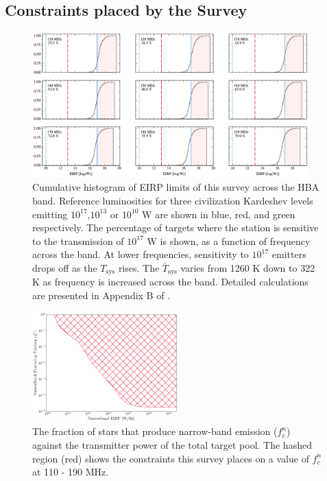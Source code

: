 \subsection{Constraints placed by the Survey}
\begin{figure}
    \centering
    \includegraphics[width = 0.95\textwidth]{figs/EIRP_hist_plot.pdf}
    \caption{Cumulative histogram of EIRP limits of this survey across the HBA band. Reference luminosities for three civilization Kardeshev levels emitting $10^{17}$,$10^{13}$ or $10^{10}$ W are shown in blue, red, and green respectively. The percentage of targets where the station is sensitive to the transmission of $10^{17}$ W is shown, as a function of frequency across the band. At lower frequencies, sensitivity to $10^{17}$ emitters drops off as the $T_{\text{sys}}$ rises. The $\bar T_{\text{sys}}$ varies from 1260 K down to 322 K as frequency is increased across the band. Detailed calculations are presented in Appendix B of \cite{johnson_simultaneous_2023}.}
    \label{fig:EIRP-limits}
\end{figure}

\begin{figure}
    \centering
    \includegraphics[width = 0.5\textwidth]{figs/narrowband-fraction.pdf}
    \caption{The fraction of stars that produce narrow-band emission ($f^n_c$) against the transmitter power of the total target pool. The hashed region (red) shows the constraints this survey places on a value of $f^n_c$ at 110 - 190 MHz.}
    \label{fig:SETI-constraint}
\end{figure}
